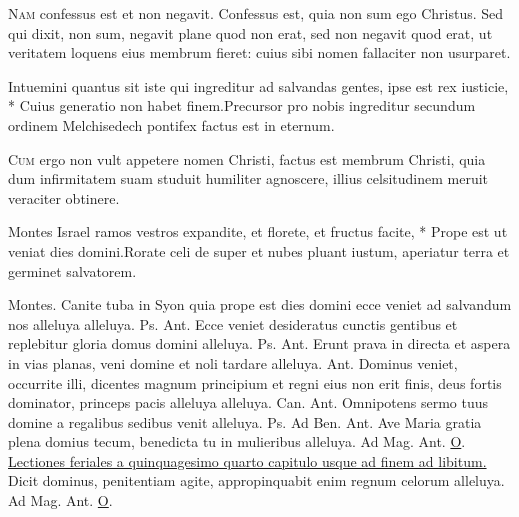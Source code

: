 \begin{multicols*}{2}
\begin{responsory}
\end{responsory}
\lettrine[lines=2]{\zallmancaps \color{Red} N}{am} confessus est et non negavit. Confessus est, quia non sum ego Christus. Sed qui dixit, non sum, negavit plane quod non erat, sed non negavit quod erat, ut veritatem loquens eius membrum fieret: cuius sibi nomen fallaciter non usurparet.
\begin{responsory}
{Intuemini quantus sit iste qui ingreditur ad salvandas gentes, ipse est rex iusticie, * Cuius generatio non habet finem.}{Precursor pro nobis ingreditur secundum ordinem Melchisedech pontifex factus est in eternum.}
\end{responsory}
\lettrine[lines=2]{\zallmancaps \color{Blue} C}{um} ergo non vult appetere nomen Christi, factus est membrum Christi, quia dum infirmitatem suam studuit humiliter agnoscere, illius celsitudinem meruit veraciter obtinere.
\begin{responsory-doxology}
{Montes Israel ramos vestros expandite, et florete, et fructus facite, * Prope est ut veniat dies domini.}{Rorate celi de super et nubes pluant iustum, aperiatur terra et germinet salvatorem.}
\end{responsory-doxology}
Montes.
 Canite tuba in Syon quia prope est dies domini ecce veniet ad salvandum nos alleluya alleluya. {\color{Red} Ps.}  {\color{Red} Ant.} Ecce veniet desideratus cunctis gentibus et replebitur gloria domus domini alleluya. {\color{Red} Ps.}  {\color{Red} Ant.} Erunt prava in directa et aspera in vias planas, veni domine et noli tardare alleluya.  {\color{Red} Ant.} Dominus veniet, occurrite illi, dicentes magnum principium et regni eius non erit finis, deus fortis dominator, princeps pacis alleluya alleluya. {\color{Red} Can.}  {\color{Red} Ant.} Omnipotens sermo tuus domine a regalibus sedibus venit alleluya. {\color{Red} Ps.}  {\color{Red} Ad Ben. Ant.} Ave Maria gratia plena domius tecum, benedicta tu in mulieribus alleluya. {\color{Red} Ad Mag. Ant.} \hyperlink{o-antiphons}{O}.
\newline \ul{Lectiones feriales a quinquagesimo quarto capitulo usque ad finem ad libitum.}
 \hypertarget{ant-dicit-dominus}{Dicit} dominus, penitentiam agite, appropinquabit enim regnum celorum alleluya. {\color{Red} Ad Mag. Ant.} \hyperlink{o-antiphons}{O}.

\end{multicols*}
